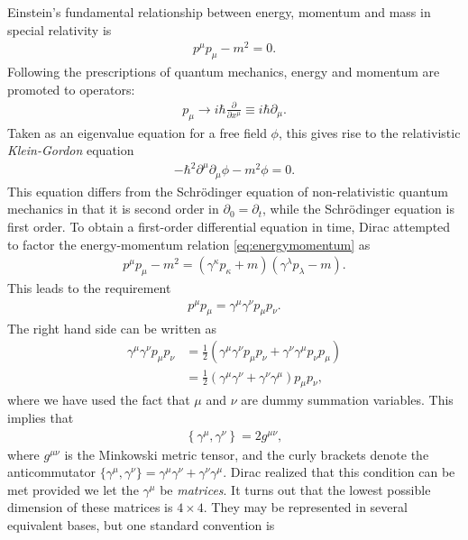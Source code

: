 \documentclass[twoside,english]{uiofysmaster}
\begin{document}
Einstein's fundamental relationship between energy, momentum and mass in special relativity is
\begin{align}
  p^\mu p_\mu - m^2 = 0.\label{eq:energymomentum}
\end{align}
Following the prescriptions of quantum mechanics, energy and momentum are promoted to operators:
\begin{align}
	p_\mu \to i\hbar \frac{\partial}{\partial x^\mu} \equiv i\hbar \partial_\mu.
\end{align}
Taken as an eigenvalue equation for a free field $\phi$, this gives rise to the relativistic {\it Klein-Gordon} equation
\begin{align}
	-\hbar^2 \partial^\mu \partial_\mu \phi - m^2 \phi = 0.
\end{align}
This equation differs from the Schr\"{o}dinger equation of non-relativistic quantum mechanics in that it is second order in $\partial_{0} = \partial_t$, while the Schr\"{o}dinger equation is first order. To obtain a first-order differential equation in time, Dirac attempted \cite{griffiths:elementary_particles} to factor the energy-momentum relation \eqref{eq:energymomentum} as
\begin{align}
	p^\mu p_\mu - m^2 = \left(\gamma^\kappa p_\kappa + m\right)\left(\gamma^\lambda p_\lambda - m\right).
\end{align}
This leads to the requirement
\begin{align}
	p^\mu p_\mu = \gamma^\mu \gamma^\nu p_\mu p_\nu.
\end{align}
The right hand side can be written as
\begin{align}
	\gamma^\mu \gamma^\nu p_\mu p_\nu &= \frac{1}{2}\left( \gamma^\mu \gamma^\nu p_\mu p_\nu + \gamma^\nu \gamma^\mu p_\nu p_\mu \right)\\
	&= \frac{1}{2}\left( \gamma^\mu \gamma^\nu  + \gamma^\nu \gamma^\mu \right) p_\mu p_\nu,
\end{align}
where we have used the fact that $\mu$ and $\nu$ are dummy summation variables. This implies that
\begin{align}
	\left\{ \gamma^\mu, \gamma^\nu \right\} = 2g^{\mu\nu},
\end{align}
where $g^{\mu\nu}$ is the Minkowski metric tensor, and the curly brackets denote the anticommutator $\{ \gamma^\mu, \gamma^\nu \} = \gamma^\mu \gamma^\nu + \gamma^\nu \gamma^\mu$. Dirac realized that this condition can be met provided we let the $\gamma^\mu$ be {\it matrices}. It turns out that the lowest possible dimension of these matrices is $4\times 4$. They may be represented in several equivalent bases, but one standard convention is
\end{document}
